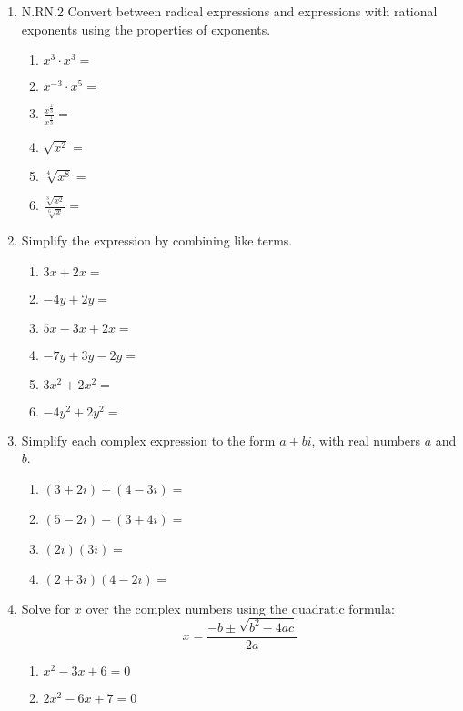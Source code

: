 \documentclass[12pt, twoside]{article}
\begin{document}
\begin{enumerate}[itemsep=0.5cm]
\item N.RN.2 Convert between radical expressions and expressions with rational exponents using the properties of exponents.
    \begin{multicols}{2}
    \begin{enumerate}[itemsep=0.5cm]
        \item $x^3 \cdot x^3 =$
        \item $x^{-3} \cdot x^{5} =$
        \item $\displaystyle \frac{x^{\frac{2}{3}}}{x^{\frac{1}{3}}} =$
        \item $\sqrt{x^2} =$
        \item $\sqrt[4]{x^8} =$
        \item $\displaystyle \frac{\sqrt[3]{x^2}}{\sqrt[6]{x}} = $
    \end{enumerate}
    \end{multicols}

\newpage
\item Simplify the expression by combining like terms.
    \begin{multicols}{2}
    \begin{enumerate}[itemsep=0.5cm]
        \item $3x+2x=$
        \item $-4y+2y=$
        \item $5x-3x+2x=$
        \item $-7y+3y-2y=$
        \item $3x^2+2x^2=$
        \item $-4y^2+2y^2=$
    \end{enumerate}
    \end{multicols}

\item Simplify each complex expression to the form $a+bi$, with real numbers $a$ and $b$.
    \begin{multicols}{2}
    \begin{enumerate}[itemsep=0.5cm]
        \item $(3+2i) + (4-3i)=$
        \item $(5-2i) - (3+4i)=$
        \item $(2i)(3i)=$
        \item $(2+3i)(4-2i)=$
    \end{enumerate}
    \end{multicols}

\item Solve for $x$ over the complex numbers using the quadratic formula:
$$x = \frac{-b \pm \sqrt{b^2-4ac}}{2a}$$
    \begin{multicols}{2}
    \begin{enumerate}[itemsep=0.5cm]
        \item $x^2-3x+6=0$
        \item $2x^2-6x+7=0$
    \end{enumerate}
    \end{multicols} \vspace{4cm}


\end{enumerate}
\end{document}

